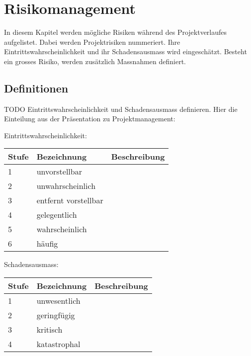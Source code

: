 \documentclass[a4paper]{report}
\begin{document}
\chapter{Risikomanagement}
In diesem Kapitel werden mögliche Risiken während des Projektverlaufes aufgelistet. Dabei werden Projektrisiken nummeriert. Ihre Eintrittswahrscheinlichkeit und ihr Schadensausmass wird eingeschätzt. Besteht ein grosses Risiko, werden zusätzlich Massnahmen definiert. 

\section{Definitionen}
TODO Eintrittswahrscheinlichkeit und Schadensausmass definieren. Hier die Einteilung aus der Präsentation zu  Projektmanagement:

\vspace{1em}
\noindent
Eintrittswahrscheinlichkeit: 

\vspace{1em}
\noindent
\begin{tabular}{|l|l|l|}
	\hline
	\textbf{Stufe} & \textbf{Bezeichnung} & \textbf{Beschreibung} \\
	\hline
	1 & unvorstellbar & \\
	\hline
	2 & unwahrscheinlich & \\
	\hline
	3 & entfernt vorstellbar & \\
	\hline
	4 & gelegentlich & \\
	\hline
	5 & wahrscheinlich & \\
	\hline
	6 & häufig & \\
	\hline
\end{tabular}

\vspace{1em}
\noindent
Schadensausmass:

\vspace{1em}
\noindent
\begin{tabular}{|l|l|l|}
	\hline
	\textbf{Stufe} & \textbf{Bezeichnung} & \textbf{Beschreibung} \\
	\hline
	1 & unwesentlich & \\
	\hline
	2 & geringfügig & \\
	\hline
	3 & kritisch & \\
	\hline
	4 & katastrophal & \\
	\hline
\end{tabular}
	
\end{document}
